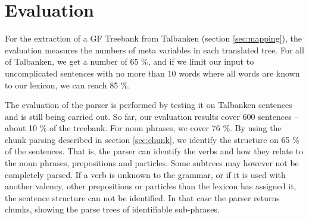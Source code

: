 \documentclass[runningheads,a4paper]{llncs}
\begin{document}
\section{Evaluation}

For the extraction of a GF Treebank from Talbanken (section \ref{sec:mapping}),
the evaluation measures the numbers of meta variables in each translated tree.
For all of Talbanken, we get a number of 65 \%, and if we limit our input to
uncomplicated sentences with no more than 10 words where all words are known to
our lexicon, we can reach 85 \%. 


The evaluation of the parser is performed by testing it on Talbanken sentences
and is still being carried out. So far, our evaluation results cover
600 sentences -- about 10 \% of the treebank. 
For noun phrases, we cover 76 \%.  By using the chunk parsing described in section
\ref{sec:chunk}, we identify the structure on 65 \% of the sentences. That
is, the parser can identify the verbs and how they relate to the noun phrases,
prepositions and particles. Some subtrees may  however not be
completely parsed. If a verb is unknown to the grammar, or if it is used with
another valency, other prepositions or particles than the lexicon has assigned
it, the sentence structure can not be identified. In that case
the parser returns chunks, showing the parse trees of identifiable sub-phrases.
\end{document}
